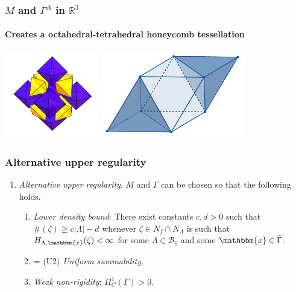 \documentclass[c, 10pt]{beamer}
\newcommand{\x}{{\mathbbm{x}}}
\begin{document}
\begin{frame}\frametitle{$M$ and $\Gamma^A$ in $\mathbb R^3$}\framesubtitle{Creates a octahedral-tetrahedral honeycomb tessellation}

\begin{centering}\includegraphics[height = 3.8cm]{./FigureLayout/tetra-exploded.PNG}
\includegraphics[height = 3.8cm]{./FigureLayout/tetra-tess.png}\end{centering}
\vspace{3mm}

\end{frame}

\begin{frame}\frametitle{Alternative upper regularity}
\begin{enumerate}[(\textbf{\^{U}})]
	\item \textit{Alternative upper regularity}. $M$ and $\Gamma$ can be chosen so that the following holds.
	\begin{enumerate}[(\^U1)]
		\item \textit{Lower density bound}: There exist constants $c,d > 0$ such that $\#(\zeta) \geq c|\Lambda| - d$ whenever $\zeta \in N_f\cap N_\Lambda$ is such that $H_{\Lambda,\x}(\zeta)<\infty$ for some $\Lambda \in \mathcal B_0$ and some $\x \in \bar\Gamma$.
		\item = (U2) \textit{Uniform summability}.
		\item \textit{Weak non-rigidity}: $\Pi^z_C(\Gamma) > 0$.
	\end{enumerate}
\end{enumerate}
\end{frame}
\end{document}
